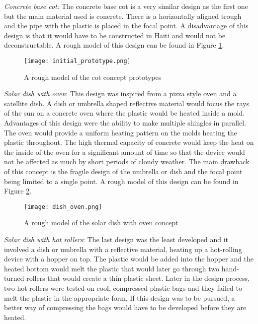 \documentclass[11pt,english]{article}
\begin{document}
\noindent \textit{Concrete base cot:} The concrete base cot is a very similar design as the first one but the main material used is concrete. There is a horizontally aligned trough and the pipe with the plastic is placed in the focal point. A disadvantage of this design is that it would have to be constructed in Haiti and would not be deconstructable. A rough model of this design can be found in Figure \ref{fig:initial_prototype}.\\

\begin{figure}[ht!]
\centering
\texttt{[image: initial\_prototype.png]}
\caption{A rough model of the cot concept prototypes}
\label{fig:initial_prototype}
\end{figure}
\newpage
\noindent \textit{Solar dish with oven}: This design was inspired from a pizza style oven and a satellite dish. A dish or umbrella shaped reflective material would focus the rays of the sun on a concrete oven where the plastic would be heated inside a mold. Advantages of this design were the ability to make multiple shingles in parallel. The oven would provide a uniform heating pattern on the molds heating the plastic throughout. The high thermal capacity of concrete would keep the heat on the inside of the oven for a significant amount of time so that the device would not be affected as much by short periods of cloudy weather. The main drawback of this concept is the fragile design of the umbrella or dish and the focal point being limited to a single point. A rough model of this design can be found in Figure \ref{fig:dish_oven}.

\begin{figure}[ht!]
\centering
\texttt{[image: dish\_oven.png]}
\caption{A rough model of the solar dish with oven concept}
\label{fig:dish_oven}
\end{figure}
\newpage
\noindent \textit{Solar dish with hot rollers}: The last design was the least developed and it involved a dish or umbrella with a reflective material, heating up a hot-rolling device with a hopper on top. The plastic would be added into the hopper and the heated bottom would melt the plastic that would later go through two hand-turned rollers that would create a thin plastic sheet. Later in the design process, two hot rollers were tested on cool, compressed plastic bags and they failed to melt the plastic in the appropriate form. If this design was to be pursued, a better way of compressing the bags would have to be developed before they are heated.
\end{document}
